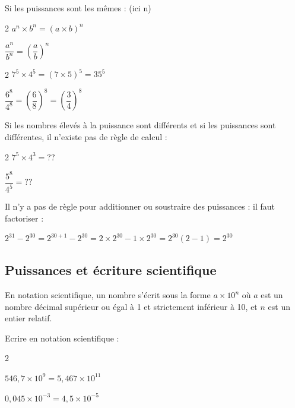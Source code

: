\documentclass[11pt,a4paper]{book}
\begin{document}
\begin{proprietes}{Si les puissances sont les mêmes : (ici n)}
	\begin{multicols}{2}
		$a^{n} \times b^{n}=(a \times b)^{n}$ \par
		$\dfrac{a^{n}}{b^{n}}=\left(\dfrac{a}{b}\right)^{n}$ \par
		
	\end{multicols}
\end{proprietes}

\begin{bexemple}{}
	\begin{multicols}{2}
		$7^{5} \times 4^{5}=(7\times 5)^5=35^5$ \par
		$\dfrac{6^{8}}{4^{8}}=\left(\dfrac{6}{8}\right)^8=\left(\dfrac{3}{4}\right)^8$ \par
	\end{multicols}
\end{bexemple}

\begin{brmqs}
	
	\begin{itemRem}
		\item Si les nombres élevés à la puissance sont différents et si les puissances sont différentes, il n’existe pas de règle de calcul : 
		
		\begin{multicols}{2}
			$7^{5} \times 4^{3}=??$ \par
			$\dfrac{5^{8}}{4^{5}}=??$ \par
		\end{multicols}
		
		\item Il n'y a pas de règle pour additionner ou soustraire des puissances : il faut factoriser : 
		
		$2^{31}-2^{30}= 2^{30+1}-2^{30}=2\times 2^{30}-1\times 2^{30}=2^{30}(2-1)=2^{30}$
		
	\end{itemRem}
	
\end{brmqs}

\subsection*{Puissances et écriture scientifique}
\begin{bdefi}
	En notation scientifique, un nombre s'écrit sous la forme $a \times 10^n$ où $a$ est un nombre décimal supérieur ou égal à 1 et strictement inférieur à 10, et $n$ est un entier relatif.
\end{bdefi}


\begin{bexemple}
	Ecrire en notation scientifique : \\
	\begin{multicols}{2}
		\begin{enumEx}
		\item $546,7 \times 10^{9}=5,467\times 10^{11}$
		\item $0,045 \times 10^{-3}=4,5\times 10^{-5}$
	\end{enumEx}
	\end{multicols}
\end{bexemple}
\end{document}
